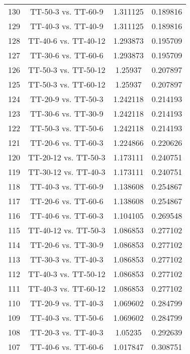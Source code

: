 \documentclass[a4paper,10pt]{article}
\begin{document}
\begin{landscape}
\begin{table}[!htp]
\begin{tabular}{cccc}
130&TT-50-3 vs. TT-60-9&1.311125&0.189816\\
129&TT-40-3 vs. TT-40-9&1.311125&0.189816\\
128&TT-40-6 vs. TT-40-12&1.293873&0.195709\\
127&TT-30-6 vs. TT-60-6&1.293873&0.195709\\
126&TT-50-3 vs. TT-50-12&1.25937&0.207897\\
125&TT-50-3 vs. TT-60-12&1.25937&0.207897\\
124&TT-20-9 vs. TT-50-3&1.242118&0.214193\\
123&TT-30-6 vs. TT-30-9&1.242118&0.214193\\
122&TT-50-3 vs. TT-50-6&1.242118&0.214193\\
121&TT-20-6 vs. TT-60-3&1.224866&0.220626\\
120&TT-20-12 vs. TT-50-3&1.173111&0.240751\\
119&TT-30-12 vs. TT-40-3&1.173111&0.240751\\
118&TT-40-3 vs. TT-60-9&1.138608&0.254867\\
117&TT-20-6 vs. TT-60-6&1.138608&0.254867\\
116&TT-40-6 vs. TT-60-3&1.104105&0.269548\\
115&TT-40-12 vs. TT-50-3&1.086853&0.277102\\
114&TT-20-6 vs. TT-30-9&1.086853&0.277102\\
113&TT-30-3 vs. TT-40-3&1.086853&0.277102\\
112&TT-40-3 vs. TT-50-12&1.086853&0.277102\\
111&TT-40-3 vs. TT-60-12&1.086853&0.277102\\
110&TT-20-9 vs. TT-40-3&1.069602&0.284799\\
109&TT-40-3 vs. TT-50-6&1.069602&0.284799\\
108&TT-20-3 vs. TT-40-3&1.05235&0.292639\\
107&TT-40-6 vs. TT-60-6&1.017847&0.308751\\
106&TT-20-12 vs. TT-40-3&1.000595&0.317023\\
105&TT-30-9 vs. TT-40-6&0.966092&0.333998\\
104&TT-40-3 vs. TT-40-12&0.914337&0.36054\\
103&TT-30-3 vs. TT-50-3&0.914337&0.36054\\
102&TT-50-3 vs. TT-60-3&0.897085&0.369673\\
101&TT-20-3 vs. TT-50-3&0.879834&0.378949\\
100&TT-50-3 vs. TT-60-6&0.810827&0.417465\\

\end{tabular}
\end{table}
\end{landscape}
\end{document}

